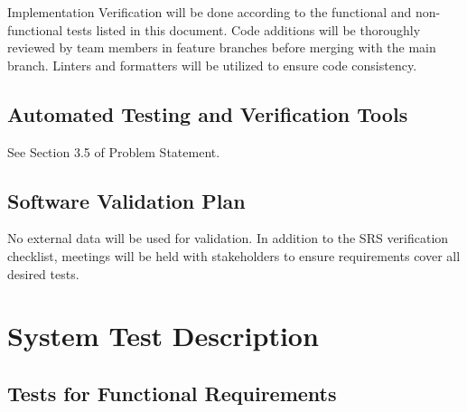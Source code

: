 \documentclass[12pt, titlepage]{article}
\begin{document}
	Implementation Verification will be done according to the functional and non-functional tests listed in this document.
	Code additions will be thoroughly reviewed by team members in feature branches before merging with the main branch.
	Linters and formatters will be utilized to ensure code consistency.
	
	\subsection{Automated Testing and Verification Tools}
	
	See Section 3.5 of Problem Statement.
	
	\subsection{Software Validation Plan}
	No external data will be used for validation. In addition to the SRS verification checklist, meetings will be held with stakeholders to ensure
	requirements cover all desired tests.
	\section{System Test Description}
	
	\subsection{Tests for Functional Requirements}
	
\end{document}
